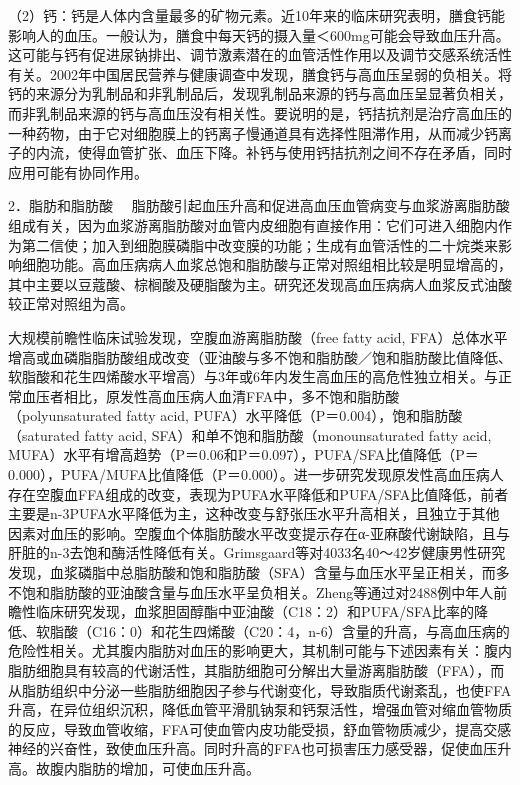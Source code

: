 （2）钙：钙是人体内含量最多的矿物元素。近10年来的临床研究表明，膳食钙能影响人的血压。一般认为，膳食中每天钙的摄入量＜600mg可能会导致血压升高。这可能与钙有促进尿钠排出、调节激素潜在的血管活性作用以及调节交感系统活性有关。2002年中国居民营养与健康调查中发现，膳食钙与高血压呈弱的负相关。将钙的来源分为乳制品和非乳制品后，发现乳制品来源的钙与高血压呈显著负相关，而非乳制品来源的钙与高血压没有相关性。要说明的是，钙拮抗剂是治疗高血压的一种药物，由于它对细胞膜上的钙离子慢通道具有选择性阻滞作用，从而减少钙离子的内流，使得血管扩张、血压下降。补钙与使用钙拮抗剂之间不存在矛盾，同时应用可能有协同作用。

{2．脂肪和脂肪酸}
　脂肪酸引起血压升高和促进高血压血管病变与血浆游离脂肪酸组成有关，因为血浆游离脂肪酸对血管内皮细胞有直接作用：它们可进入细胞内作为第二信使；加入到细胞膜磷脂中改变膜的功能；生成有血管活性的二十烷类来影响细胞功能。高血压病病人血浆总饱和脂肪酸与正常对照组相比较是明显增高的，其中主要以豆蔻酸、棕榈酸及硬脂酸为主。研究还发现高血压病病人血浆反式油酸较正常对照组为高。

大规模前瞻性临床试验发现，空腹血游离脂肪酸（free fatty acid,
FFA）总体水平增高或血磷脂脂肪酸组成改变（亚油酸与多不饱和脂肪酸／饱和脂肪酸比值降低、软脂酸和花生四烯酸水平增高）与3年或6年内发生高血压的高危性独立相关。与正常血压者相比，原发性高血压病人血清FFA中，多不饱和脂肪酸（polyunsaturated
fatty acid, PUFA）水平降低（P＝0.004），饱和脂肪酸（saturated fatty
acid, SFA）和单不饱和脂肪酸（monounsaturated fatty acid,
MUFA）水平有增高趋势（P＝0.06和P＝0.097），PUFA/SFA比值降低（P＝0.000），PUFA/MUFA比值降低（P＝0.000）。进一步研究发现原发性高血压病人存在空腹血FFA组成的改变，表现为PUFA水平降低和PUFA/SFA比值降低，前者主要是n-3PUFA水平降低为主，这种改变与舒张压水平升高相关，且独立于其他因素对血压的影响。空腹血个体脂肪酸水平改变提示存在α-亚麻酸代谢缺陷，且与肝脏的n-3去饱和酶活性降低有关。Grimsgaard等对4033名40～42岁健康男性研究发现，血浆磷脂中总脂肪酸和饱和脂肪酸（SFA）含量与血压水平呈正相关，而多不饱和脂肪酸的亚油酸含量与血压水平呈负相关。Zheng等通过对2488例中年人前瞻性临床研究发现，血浆胆固醇酯中亚油酸（C18：2）和PUFA/SFA比率的降低、软脂酸（C16：0）和花生四烯酸（C20：4，n-6）含量的升高，与高血压病的危险性相关。尤其腹内脂肪对血压的影响更大，其机制可能与下述因素有关：腹内脂肪细胞具有较高的代谢活性，其脂肪细胞可分解出大量游离脂肪酸（FFA），而从脂肪组织中分泌一些脂肪细胞因子参与代谢变化，导致脂质代谢紊乱，也使FFA升高，在异位组织沉积，降低血管平滑肌钠泵和钙泵活性，增强血管对缩血管物质的反应，导致血管收缩，FFA可使血管内皮功能受损，舒血管物质减少，提高交感神经的兴奋性，致使血压升高。同时升高的FFA也可损害压力感受器，促使血压升高。故腹内脂肪的增加，可使血压升高。

